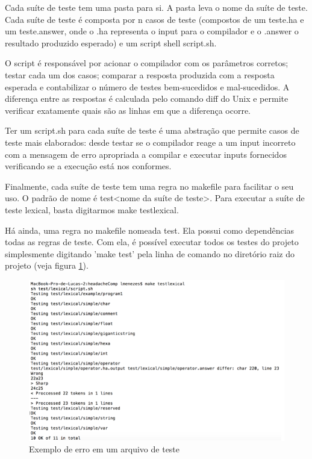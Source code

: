 Cada suíte de teste tem uma pasta para si. A pasta leva o nome da suíte de teste. Cada suíte de teste é composta por n casos de teste (compostos de um teste.ha e  um teste.answer, onde o .ha representa o input para o compilador e o .answer o resultado produzido esperado) e um script shell script.sh. 

O script é responsável por acionar o compilador com os parâmetros corretos; testar cada um dos casos; comparar a resposta produzida com a resposta esperada e contabilizar o número de testes bem-sucedidos e mal-sucedidos. A diferença entre as respostas é calculada pelo comando diff do Unix e permite verificar exatamente quais são as linhas em que a diferença ocorre.

Ter um script.sh para cada suíte de teste é uma abstração que permite casos de teste mais elaborados: desde testar se o compilador reage a um input incorreto com a mensagem de erro apropriada a compilar e executar inputs fornecidos verificando se a execução está nos conformes.

Finalmente, cada suíte de teste tem uma regra no makefile para facilitar o seu uso. O padrão de nome é test<nome da suíte de teste>. Para executar a suíte de teste lexical, basta digitarmos make testlexical.

Há ainda, uma regra no makefile nomeada test. Ela possui como dependências todas as regras de teste. Com ela, é possível executar todos os testes do projeto simplesmente digitando 'make test' pela linha de comando no diretório raiz do projeto (veja figura \ref{erro}).

\begin{figure}[h]
    \centering
	\includegraphics[]{TD/img/erro.png}
	\caption{Exemplo de erro em um arquivo de teste}
	\label{erro}
\end{figure}

